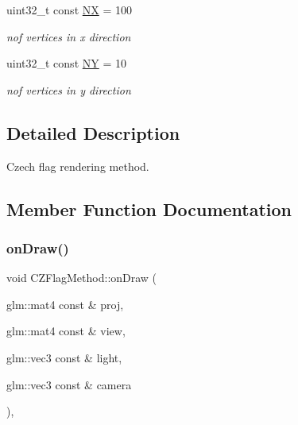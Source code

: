 \begin{DoxyCompactItemize}
\mbox{\label{classCZFlagMethod_ad9bf715285c16dac0f9c6018431abf61}} 
uint32\+\_\+t const \hyperlink{classCZFlagMethod_ad9bf715285c16dac0f9c6018431abf61}{NX} = 100
\begin{DoxyCompactList}\small\item\em nof vertices in x direction \end{DoxyCompactList}\item 
\mbox{\label{classCZFlagMethod_aa0e93166f0ed7d7ecc6e22f105a43020}} 
uint32\+\_\+t const \hyperlink{classCZFlagMethod_aa0e93166f0ed7d7ecc6e22f105a43020}{NY} = 10
\begin{DoxyCompactList}\small\item\em nof vertices in y direction \end{DoxyCompactList}\end{DoxyCompactItemize}


\subsection{Detailed Description}
Czech flag rendering method. 

\subsection{Member Function Documentation}
\mbox{\label{classCZFlagMethod_a72425a172b48b3f730b9b8c7745cc70a}} 
\subsubsection{\texorpdfstring{on\+Draw()}{onDraw()}}
{\footnotesize\ttfamily void C\+Z\+Flag\+Method\+::on\+Draw (\begin{DoxyParamCaption}\item[{glm\+::mat4 const \&}]{proj,  }\item[{glm\+::mat4 const \&}]{view,  }\item[{glm\+::vec3 const \&}]{light,  }\item[{glm\+::vec3 const \&}]{camera }\end{DoxyParamCaption})\hspace{0.3cm}{\ttfamily [override]}, {\ttfamily [virtual]}}



